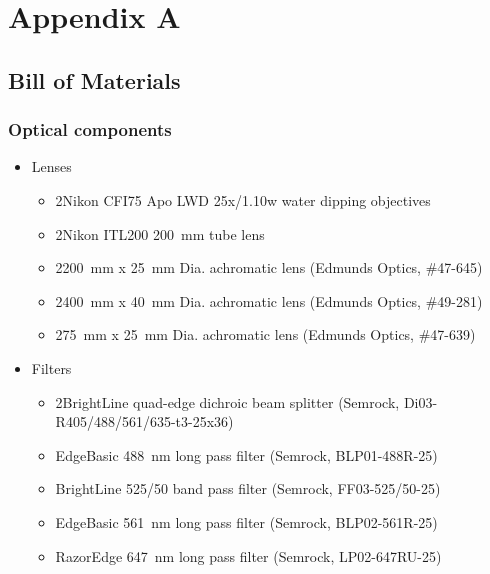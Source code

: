 \cleardoublepage
\chapter*{Appendix A}

\setcounter{table}{0}
\renewcommand{\thetable}{A\arabic{table}}

\begin{singlespace}
  
\section*{Bill of Materials}

\subsection*{Optical components}
  \begin{itemize}
    \item Lenses
    \begin{itemize}
      \item 2\texttimes Nikon CFI75 Apo LWD 25x/1.10w water dipping objectives
      \item 2\texttimes Nikon ITL200 \SI{200}{mm} tube lens
      \item 2\texttimes \SI{200}{mm} x \SI{25}{mm} Dia. achromatic lens (Edmunds Optics, \#47-645)
      \item 2\texttimes \SI{400}{mm} x \SI{40}{mm} Dia. achromatic lens (Edmunds Optics, \#49-281)
      \item 2\texttimes \SI{75}{mm} x \SI{25}{mm} Dia. achromatic lens (Edmunds Optics, \#47-639)
    \end{itemize}
    \item Filters
    \begin{itemize}
      \item 2\texttimes BrightLine quad-edge dichroic beam splitter (Semrock, Di03-R405/488/561/635-t3-25x36)
      \item EdgeBasic \SI{488}{nm} long pass filter (Semrock, BLP01-488R-25)
      \item BrightLine 525/50 band pass filter (Semrock, FF03-525/50-25)
      \item EdgeBasic \SI{561}{nm} long pass filter (Semrock, BLP02-561R-25)
      \item RazorEdge \SI{647}{nm} long pass filter (Semrock, LP02-647RU-25)

\end{itemize}
\end{itemize}
\end{singlespace}
